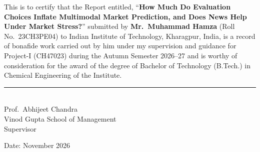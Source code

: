 \begin{center}\end{center}
\vspace{2.4cm}
\noindent\hspace{1.5em}This is to certify that the Report entitled, ``\textbf{How Much Do Evaluation Choices Inflate Multimodal Market Prediction, and Does News Help Under Market Stress?}'' submitted by \textbf{Mr.\ Muhammad Hamza} (Roll No.\ 23CH3PE04) to Indian Institute of Technology, Kharagpur, India, is a record of bonafide work carried out by him under my supervision and guidance for Project-I (CH47023) during the Autumn Semester 2026--27 and is worthy of consideration for the award of the degree of Bachelor of Technology (B.Tech.) in Chemical Engineering of the Institute.
\vspace{4.6cm}

\noindent\rule{5.5cm}{0.5pt}\\
Prof.\ Abhijeet Chandra\\
Vinod Gupta School of Management\\
Supervisor

\vspace{1cm}
\noindent Date: November 2026
